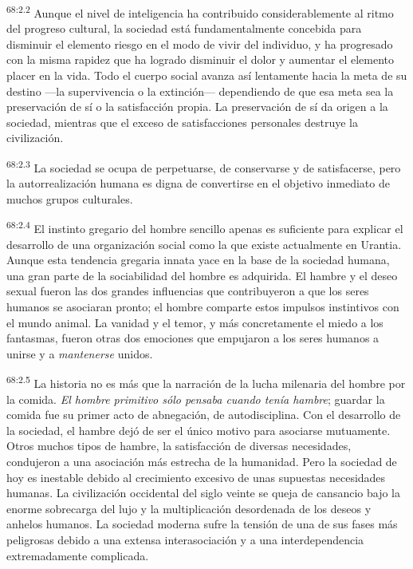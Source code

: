\par
\textsuperscript{68:2.2} Aunque el nivel de inteligencia ha contribuido considerablemente al ritmo del progreso cultural, la sociedad está fundamentalmente concebida para disminuir el elemento riesgo en el modo de vivir del individuo, y ha progresado con la misma rapidez que ha logrado disminuir el dolor y aumentar el elemento placer en la vida. Todo el cuerpo social avanza así lentamente hacia la meta de su destino ---la supervivencia o la extinción--- dependiendo de que esa meta sea la preservación de sí o la satisfacción propia. La preservación de sí da origen a la sociedad, mientras que el exceso de satisfacciones personales destruye la civilización.

\par
\textsuperscript{68:2.3} La sociedad se ocupa de perpetuarse, de conservarse y de satisfacerse, pero la autorrealización humana es digna de convertirse en el objetivo inmediato de muchos grupos culturales.

\par
\textsuperscript{68:2.4} El instinto gregario del hombre sencillo apenas es suficiente para explicar el desarrollo de una organización social como la que existe actualmente en Urantia. Aunque esta tendencia gregaria innata yace en la base de la sociedad humana, una gran parte de la sociabilidad del hombre es adquirida. El hambre y el deseo sexual fueron las dos grandes influencias que contribuyeron a que los seres humanos se asociaran pronto; el hombre comparte estos impulsos instintivos con el mundo animal. La vanidad y el temor, y más concretamente el miedo a los fantasmas, fueron otras dos emociones que empujaron a los seres humanos a unirse y a \textit{mantenerse} unidos.

\par
\textsuperscript{68:2.5} La historia no es más que la narración de la lucha milenaria del hombre por la comida. \textit{El hombre primitivo sólo pensaba cuando tenía hambre}; guardar la comida fue su primer acto de abnegación, de autodisciplina. Con el desarrollo de la sociedad, el hambre dejó de ser el único motivo para asociarse mutuamente. Otros muchos tipos de hambre, la satisfacción de diversas necesidades, condujeron a una asociación más estrecha de la humanidad. Pero la sociedad de hoy es inestable debido al crecimiento excesivo de unas supuestas necesidades humanas. La civilización occidental del siglo veinte se queja de cansancio bajo la enorme sobrecarga del lujo y la multiplicación desordenada de los deseos y anhelos humanos. La sociedad moderna sufre la tensión de una de sus fases más peligrosas debido a una extensa interasociación y a una interdependencia extremadamente complicada.

